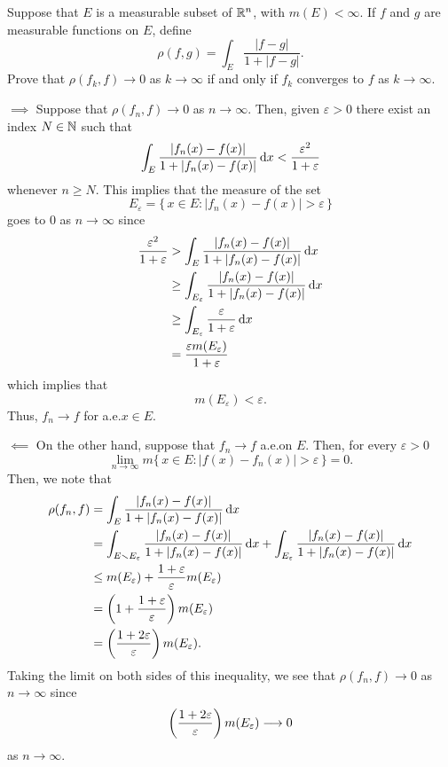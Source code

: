 \begin{problem}
  Suppose that \(E\) is a measurable subset of \(\mathbb{R}^n\), with
  \(m(E)<\infty\). If \(f\) and \(g\) are measurable functions on \(E\),
  define
  \[
    \rho(f,g)=\int_E\frac{|f-g|}{1+|f-g|}.
  \]
  Prove that \(\rho(f_k,f)\to 0\) as \(k\to\infty\) if and only if \(f_k\)
  converges to \(f\) as \(k\to\infty\).
\end{problem}
\begin{solution}
  \(\implies\) Suppose that \(\rho(f_n,f)\to 0\) as \(n\to\infty\). Then,
  given \(\varepsilon>0\) there exist an index \(N\in\mathbb{N}\) such that
  \[
    \int_E \frac{|f_n(x)-f(x)|}{1+|f_n(x)-f(x)|}\mathop{}\!\mathrm{d} x
    <\frac{\varepsilon^2}{1+\varepsilon}
  \]
  whenever \(n\geq N\). This implies that the measure of the set
  \[
    E_\varepsilon=\bigr\{\,x\in E:|f_n(x)-f(x)|>\varepsilon\,\bigl\}
  \]
  goes to \(0\) as \(n\to\infty\) since
  \begin{align*}
    \frac{\varepsilon^2}{1+\varepsilon}
    &>\int_E \frac{|f_n(x)-f(x)|}{1+|f_n(x)-f(x)|}\mathop{}\!\mathrm{d} x\\
    &\geq \int_{E_\varepsilon}
    \frac{|f_n(x)-f(x)|}{1+|f_n(x)-f(x)|}\mathop{}\!\mathrm{d} x\\
    &\geq\int_{E_\varepsilon}\frac{\varepsilon}{1+\varepsilon}\mathop{}\!\mathrm{d} x\\
    &=\frac{\varepsilon m(E_\varepsilon)}{1+\varepsilon}
  \end{align*}
  which implies that
  \[
    m(E_\varepsilon)<\varepsilon.
  \]
  Thus, \(f_n\to f\) for a.e.\@ \(x\in E\).

  \(\impliedby\) On the other hand, suppose that \(f_n\to f\) a.e.\@ on
  \(E\). Then, for every \(\varepsilon>0\)
  \[
    \lim_{n\to\infty}m\bigl\{\,x\in
    E:|f(x)-f_n(x)|>\varepsilon\,\bigr\}=0.
  \]
  Then, we note that
  \begin{align*}
    \rho(f_n,f)
    &=\int_E \frac{|f_n(x)-f(x)|}{1+|f_n(x)-f(x)|}\mathop{}\!\mathrm{d} x\\
    &=\int_{E\smallsetminus E_\varepsilon} \frac{|f_n(x)-f(x)|}{1+|f_n(x)-f(x)|}\mathop{}\!\mathrm{d} x
      +\int_{E_\varepsilon} \frac{|f_n(x)-f(x)|}{1+|f_n(x)-f(x)|}\mathop{}\!\mathrm{d} x\\
    &\leq
      m(E_\varepsilon)+\frac{1+\varepsilon}{\varepsilon}m(E_\varepsilon)\\
    &=\left(1+\frac{1+\varepsilon}{\varepsilon}\right)m(E_\varepsilon)\\
    &=\left(\frac{1+2\varepsilon}{\varepsilon}\right)m(E_\varepsilon).
  \end{align*}
  Taking the limit on both sides of this inequality, we see that
  \(\rho(f_n,f)\to 0\) as \(n\to\infty\) since
  \[
    \left(\frac{1+2\varepsilon}{\varepsilon}\right)m(E_\varepsilon)\longrightarrow 0
  \]
  as \(n\to\infty\).
\end{solution}

